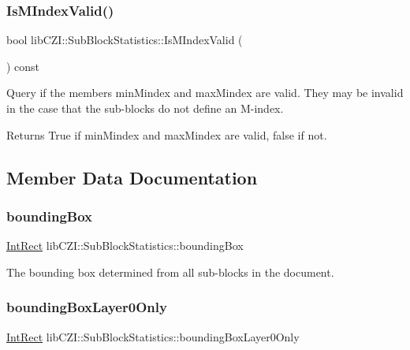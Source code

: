 \subsubsection{\texorpdfstring{Is\+M\+Index\+Valid()}{IsMIndexValid()}}
{\footnotesize\ttfamily bool lib\+C\+Z\+I\+::\+Sub\+Block\+Statistics\+::\+Is\+M\+Index\+Valid (\begin{DoxyParamCaption}{ }\end{DoxyParamCaption}) const\hspace{0.3cm}{\ttfamily [inline]}}

Query if the members min\+Mindex and max\+Mindex are valid. They may be invalid in the case that the sub-\/blocks do not define an M-\/index.

\begin{DoxyReturn}{Returns}
True if min\+Mindex and max\+Mindex are valid, false if not. 
\end{DoxyReturn}


\subsection{Member Data Documentation}
\mbox{\label{structlib_c_z_i_1_1_sub_block_statistics_a924c2adf7f3e132470dfeb06ea1e958c}} 
\subsubsection{\texorpdfstring{bounding\+Box}{boundingBox}}
{\footnotesize\ttfamily \hyperlink{structlib_c_z_i_1_1_int_rect}{Int\+Rect} lib\+C\+Z\+I\+::\+Sub\+Block\+Statistics\+::bounding\+Box}

The bounding box determined from all sub-\/blocks in the document. \mbox{\label{structlib_c_z_i_1_1_sub_block_statistics_a5256d470970ed24507b6bd1fadf32096}} 
\subsubsection{\texorpdfstring{bounding\+Box\+Layer0\+Only}{boundingBoxLayer0Only}}
{\footnotesize\ttfamily \hyperlink{structlib_c_z_i_1_1_int_rect}{Int\+Rect} lib\+C\+Z\+I\+::\+Sub\+Block\+Statistics\+::bounding\+Box\+Layer0\+Only}

